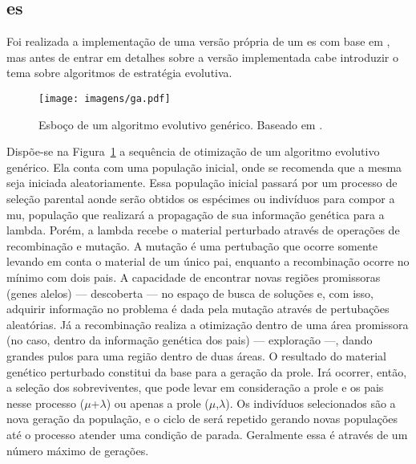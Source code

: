 \subsection[Algoritmo Genético de Estratégia Evolutiva]{\acf{es}}
\label{ssec:es}

Foi realizada a implementação de uma versão própria de um \acs{es} com
base em \cite[cap. 4]{eiben2003introduction}, mas antes de entrar em
detalhes sobre a versão implementada cabe introduzir o tema sobre
algoritmos de estratégia evolutiva.

\begin{figure}[h!t]
\centering
\texttt{[image: imagens/ga.pdf]}
\caption[Esboço de um algoritmo evolutivo genérico.]
{Esboço de um algoritmo evolutivo genérico. Baseado em
\cite[pp. 17]{eiben2003introduction}.}
\label{fig:esboco_ga}
\end{figure}

Dispõe-se na Figura~\ref{fig:esboco_ga} a sequência de otimização de
um algoritmo evolutivo genérico. Ela conta com uma população inicial,
onde se recomenda que a mesma seja iniciada aleatoriamente.  Essa
população inicial passará por um processo de seleção parental aonde
serão obtidos os espécimes ou indivíduos para compor a \gls{mu},
população que realizará a propagação de sua informação genética
para a \gls{lambda}. Porém, a \acl{lambda} recebe o material
perturbado através de operações de recombinação e mutação. A mutação é
uma pertubação que ocorre somente levando em conta o material de um
único pai, enquanto a recombinação ocorre no mínimo com dois pais. A
capacidade de encontrar novas regiões promissoras (genes alelos) ---
descoberta --- no espaço de busca de soluções e, com isso, adquirir
informação no problema é dada pela mutação através de pertubações
aleatórias. Já a recombinação realiza a otimização dentro de uma área
promissora (no caso, dentro da informação genética dos pais) ---
exploração ---, dando grandes pulos para uma região dentro de duas
áreas. O resultado do material genético perturbado constitui da base
para a geração da prole. Irá ocorrer, então, a seleção dos
sobreviventes, que pode levar em consideração a prole e os pais nesse
processo ($\mu$+$\lambda$) ou apenas a prole ($\mu$,$\lambda$). Os
indivíduos selecionados são a nova geração da população, e o ciclo de
será repetido gerando novas populações até o processo atender uma
condição de parada. Geralmente essa é através de um número máximo de
gerações.

